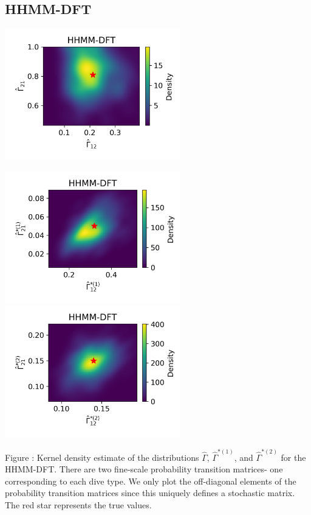 \documentclass{article}
\begin{document}
        \newpage
        \subsection{HHMM-DFT}
        \begin{center}
        \includegraphics[width=3in]{../Plots/hhmm_FV_uncorr_Gamma_density_-1.png}
        
        \includegraphics[width=3in]{../Plots/hhmm_FV_uncorr_Gamma_density_0.png}
        \includegraphics[width=3in]{../Plots/hhmm_FV_uncorr_Gamma_density_1.png}
        \end{center}
        
        \noindent Figure : Kernel density estimate of the distributions $\hat \Gamma$, $\hat \Gamma^{*(1)}$, and $\hat \Gamma^{*(2)}$ for the HHMM-DFT. There are two fine-scale probability transition matrices- one corresponding to each dive type. We only plot the off-diagonal elements of the probability transition matrices since this uniquely defines a stochastic matrix. The red star represents the true values.
        \addtocounter{fignum}{1}
        
\end{document}

